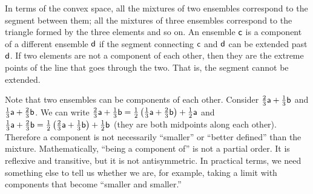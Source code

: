\begin{mathSection}
\begin{remark}
	In terms of the convex space, all the mixtures of two ensembles correspond to the segment between them; all the mixtures of three ensembles correspond to the triangle formed by the three elements and so on. An ensemble $\ens[c]$ is a component of a different ensemble $\ens[d]$ if the segment connecting $\ens[c]$ and $\ens[d]$ can be extended past $\ens[d]$. If two elements are not a component of each other, then they are the extreme points of the line that goes through the two. That is, the segment cannot be extended.
\end{remark}

\begin{figure}[H]
	\centering
\end{figure}

\begin{remark}
	Note that two ensembles can be components of each other. Consider $\frac{2}{3} \ens[a] + \frac{1}{3} \ens[b]$ and $\frac{1}{3} \ens[a] + \frac{2}{3} \ens[b]$. We can write $\frac{2}{3} \ens[a] + \frac{1}{3} \ens[b] = \frac{1}{2}\left(\frac{1}{3} \ens[a] + \frac{2}{3} \ens[b]\right) + \frac{1}{2} \ens[a]$ and $\frac{1}{3} \ens[a] + \frac{2}{3} \ens[b] = \frac{1}{2}\left(\frac{2}{3} \ens[a] + \frac{1}{3} \ens[b]\right) + \frac{1}{2} \ens[b]$ (they are both midpoints along each other). Therefore a component is not necessarily ``smaller'' or ``better defined'' than the mixture. Mathematically, ``being a component of'' is not a partial order. It is reflexive and transitive, but it is not antisymmetric. In practical terms, we need something else to tell us whether we are, for example, taking a limit with components that become ``smaller and smaller.''
\end{remark}
\end{mathSection}

